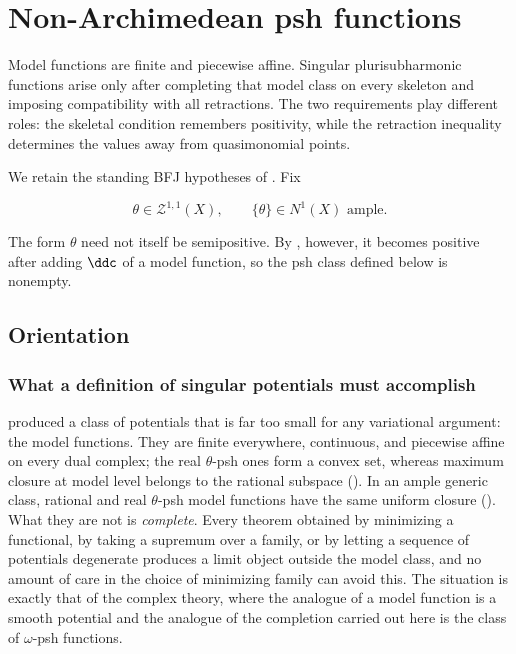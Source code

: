 \chapter{Non-Archimedean psh functions}
\label{chap:bfj-psh}

Model functions are finite and piecewise affine.  Singular
plurisubharmonic functions arise only after completing that model class on
every skeleton and imposing compatibility with all retractions.  The two
requirements play different roles: the skeletal condition remembers
positivity, while the retraction inequality determines the values away from
quasimonomial points.

We retain the standing BFJ hypotheses of
.  Fix

\begin{equation}
\label{eq:ch21-standing-theta}
            \theta\in\mathcal Z^{1,1}(X),
            \qquad \{\theta\}\in N^1(X)\text{ ample}.
\end{equation}

The form $\theta$ need not itself be semipositive.  By
, however, it becomes positive after
adding $\ddc$ of a model function, so the psh class defined below is
nonempty.

\section{Orientation}
\label{sec:ch21-orientation}

\subsection{What a definition of singular potentials must accomplish}
\label{sec:ch21-what-must-be-done}

 produced a class of potentials that is far too
small for any variational argument: the model functions.  They are finite
everywhere, continuous, and piecewise affine on every dual complex; the
real $\theta$-psh ones form a convex set, whereas maximum closure at
model level belongs to the rational subspace
().  In an ample generic class, rational and real
$\theta$-psh model functions have the same uniform closure
().  What they are not is
\emph{complete}.  Every
theorem obtained by minimizing a functional, by taking a supremum over a
family, or by letting a sequence of potentials degenerate produces a limit
object outside the model class, and no amount of care in the choice of
minimizing family can avoid this.  The situation is exactly that of the
complex theory, where the analogue of a model function is a smooth
potential and the analogue of the completion carried out here is the class
of $\omega$-psh functions.

